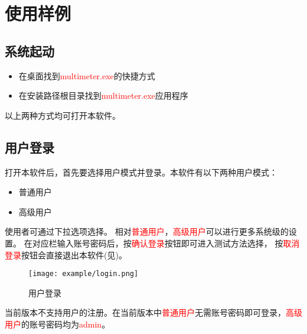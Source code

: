\chapter{使用样例\label{ch:excample}}
\section{系统起动}
\begin{itemize}
	\item 在桌面找到\textcolor{red}{multimeter.exe}的快捷方式
	\item 在安装路径根目录找到\textcolor{red}{multimeter.exe}应用程序
\end{itemize}
以上两种方式均可打开本软件。
\section{用户登录\label{subsec:Advance}}
打开本软件后，首先要选择用户模式并登录。本软件有以下两种用户模式：
\begin{itemize}
	\item 普通用户
	\item 高级用户
\end{itemize}
使用者可通过下拉选项选择。
相对\textcolor{red}{普通用户}，\textcolor{red}{高级用户}可以进行更多系统级的设置。
在对应栏输入账号密码后，按\textcolor{red}{确认登录}按钮即可进入测试方法选择，
按\textcolor{red}{取消登录}按钮会直接退出本软件(见)。
\begin{figure}[H]
	\centering
	\texttt{[image: example/login.png]}
	\caption{ 用户登录 \label{fig:exmp_login}}
\end{figure}
\begin{note}
	当前版本不支持用户的注册。在当前版本中\textcolor{red}{普通用户}无需账号密码即可登录，\textcolor{red}{高级用户}的账号密码均为\textcolor{red}{admin}。
\end{note}






